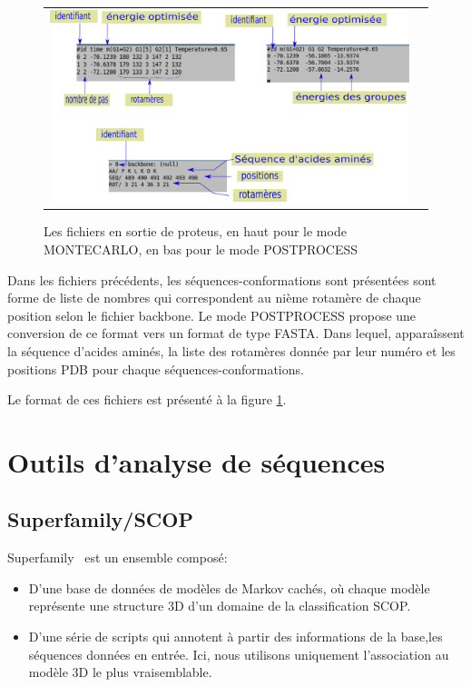 \begin{enumerate}
   \begin{figure}[!htbp]
     \centering
     \begin{tabular}{cc}
       \includegraphics[width=12cm]{figure/output.png} &
     \end{tabular}
     
     \caption{Les fichiers en sortie de proteus, en haut pour le mode MONTECARLO, en bas pour le mode POSTPROCESS}
\label{proteusoutput}
   \end{figure}




Dans les fichiers précédents, les séquences-conformations sont présentées sont forme de liste de nombres qui correspondent au nième rotamère de chaque position selon le fichier backbone. Le mode POSTPROCESS propose une conversion de ce format vers un format de type FASTA. Dans lequel,  apparaîssent la séquence d'acides aminés, la liste des rotamères donnée par leur numéro et les positions PDB pour chaque séquences-conformations.

Le format de ces fichiers est présenté à la figure \ref{proteusoutput}.


\section{Outils d'analyse de séquences} 
\subsection{Superfamily/SCOP}
\label{subsection:Superfamily}

Superfamily~\citep{refSuperfamily} est un ensemble composé: 

\begin{itemize}
\item D'une base de données de modèles de Markov cachés, où chaque modèle représente une structure 3D d'un domaine de la classification SCOP.
\item D'une série de scripts qui annotent à partir des informations de la base,les séquences données en entrée. Ici, nous utilisons uniquement l'association au modèle 3D le plus vraisemblable. 
\end{itemize}


\end{enumerate}
